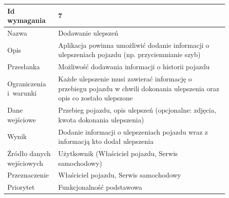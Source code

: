 \documentclass[12pt]{article}
\begin{document}
\begin{table}[H]
\begin{center}
	\begin{tabular}{|p{0.18\linewidth}|p{0.72\linewidth}|}%
	\hline
	Id wymagania 	& 7 				\\ \hline
	Nazwa			& Dodawanie ulepszeń
 \\ \hline
	Opis &	Aplikacja powinna umożliwić dodanie informacji o ulepszeniach pojazdu (np. przyciemnianie szyb)\\ \hline
	Przesłanka & Możliwość dodawania informacji o historii pojazdu  \\ \hline
	Ograniczenia i~warunki & Każde ulepszenie musi zawierać informację o przebiegu pojazdu w chwili dokonania ulepszenia oraz opis co zostało ulepszone \\ \hline
	Dane wejściowe &Przebieg pojazdu, opis ulepszeń
(opcjonalne: zdjęcia, kwota dokonania ulepszenia) \\ \hline
	Wynik & Dodanie informacji o ulepszeniach pojazdu wraz z informacją kto dodał ulepszenia\\ \hline
	Źródło danych wejściowych &Użytkownik (Właściciel pojazdu, Serwis samochodowy)\\ \hline
	Przeznaczenie &Właściciel pojazdu, Serwis samochodowy\\ \hline
	Priorytet & Funkcjonalność podstawowa \\ \hline
	\end{tabular}
\end{center}
\end{table}
\end{document}
